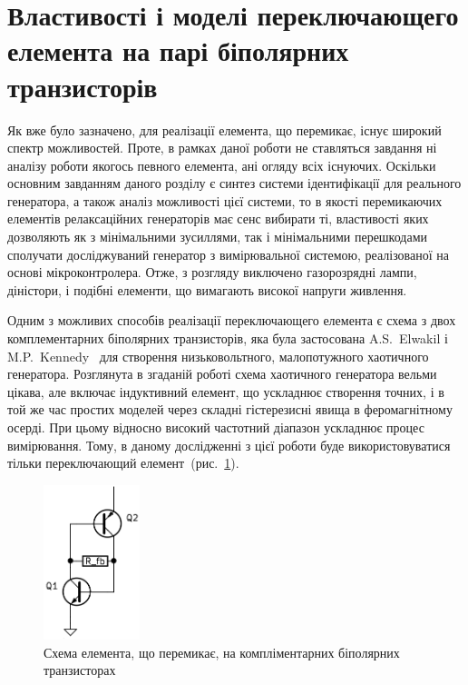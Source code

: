 \section{Властивості і моделі переключающего елемента на парі біполярних транзисторів}
\label{atu:sec:relax3d_sw}

Як вже було зазначено, для реалізації
елемента, що перемикає, існує широкий спектр
можливостей. Проте, в рамках даної роботи не ставляться завдання
ні аналізу роботи якогось певного елемента, ані огляду всіх
існуючих. Оскільки основним завданням даного розділу є синтез
системи ідентифікації для реального генератора, а також аналіз
можливості цієї системи, то в якості перемикаючих елементів
релаксаційних генераторів має сенс вибирати ті, властивості
яких дозволяють як з мінімальними зусиллями, так і мінімальними
перешкодами сполучати досліджуваний генератор з вимірювальної
системою, реалізованої на основі мікроконтролера. Отже, з
розгляду виключено газорозрядні лампи, діністори, і подібні
елементи, що вимагають високої напруги живлення.


Одним з можливих способів реалізації переключающего
елемента є схема з двох комплементарних біполярних
транзисторів, яка була застосована A.S.~Elwakil і M.P.~Kennedy~\cite{kennedy1999} для
створення низьковольтного, малопотужного хаотичного
генератора. Розглянута в згаданій роботі схема хаотичного
генератора вельми цікава, але включає індуктивний елемент,
що ускладнює створення точних, і в той же час простих
моделей через складні гістерезисні
явища в феромагнітному осерді. При цьому відносно високий
частотний діапазон ускладнює процес вимірювання. Тому,
в даному дослідженні з цієї роботи буде використовуватися
тільки переключающий елемент~(рис.~\ref{atu:f:relax3d_switch}).

\begin{figure}[htb!]
  \centerline{\includegraphics[width=0.25\textwidth]{p/relax3d_switch.png} }
\caption{Схема елемента, що перемикає, на компліментарних біполярних транзисторах}
\label{atu:f:relax3d_switch}
\end{figure}



